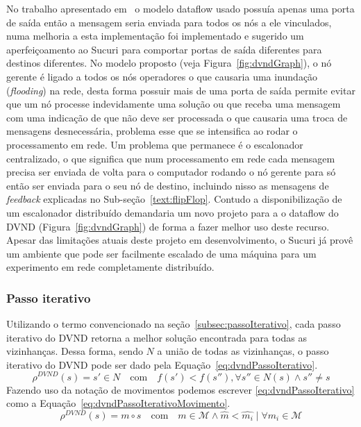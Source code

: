 No trabalho apresentado em~\cite{df-dvnd2018} o modelo dataflow usado possuía apenas uma porta de saída então a mensagem seria enviada para todos os nós a ele vinculados, numa melhoria a esta implementação foi implementado e sugerido um aperfeiçoamento ao Sucuri para comportar portas de saída diferentes para destinos diferentes.
No modelo proposto (veja Figura~\ref{fig:dvndGraph}), o nó gerente é ligado a todos os nós operadores o que causaria uma inundação (\emph{flooding}) na rede, desta forma possuir mais de uma porta de saída permite evitar que um nó processe indevidamente uma solução ou que receba uma mensagem com uma indicação de que não deve ser processada o que causaria uma troca de mensagens desnecessária, problema esse que se intensifica ao rodar o processamento em rede.
Um problema que permanece é o escalonador centralizado, o que significa que num processamento em rede cada mensagem precisa ser enviada de volta para o computador rodando o nó gerente para só então ser enviada para o seu nó de destino, incluindo nisso as mensagens de \emph{feedback} explicadas no Sub-seção~\ref{text:flipFlop}.
Contudo a disponibilização de um escalonador distribuído demandaria um novo projeto para a o dataflow do DVND (Figura~\ref{fig:dvndGraph}) de forma a fazer melhor uso deste recurso.
Apesar das limitações atuais deste projeto em desenvolvimento, o Sucuri já provê um ambiente que pode ser facilmente escalado de uma máquina para um experimento em rede completamente distribuído.

\subsubsection{Passo iterativo}

Utilizando o termo convencionado na seção~\ref{subsec:passoIterativo}, cada passo iterativo do DVND retorna a melhor solução encontrada para todas as vizinhanças.
Dessa forma, sendo $N$ a união de todas as vizinhanças, o passo iterativo do DVND pode ser dado pela Equação~\ref{eq:dvndPassoIterativo}.
\begin{equation} \label{eq:dvndPassoIterativo}
\rho^{DVND}(s) = s' \in N \quad \textrm{com} \quad f(s') < f(s''), \forall s'' \in N(s) \land s'' \ne s
\end{equation}
Fazendo uso da notação de movimentos podemos escrever \ref{eq:dvndPassoIterativo} como a Equação~\ref{eq:dvndPassoIterativoMovimento}.
\begin{equation} \label{eq:dvndPassoIterativoMovimento}
\rho^{DVND}(s) = m \circ s\quad \textrm{com} \quad m \in \mathcal{M} \land \widehat{m} < \widehat{m_i} \mid \forall m_i \in \mathcal{M}
\end{equation}

